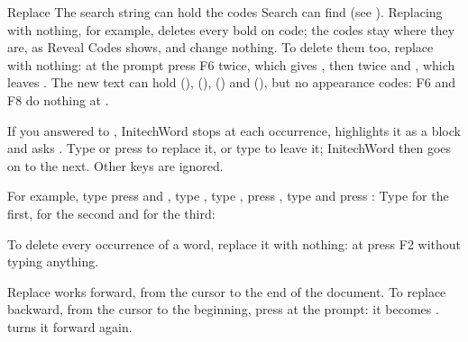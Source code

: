 \begin{Feature}{Replace}
The search string can hold the codes Search can find (see ).
Replacing \Code{[BOLD]} with nothing, for example, deletes every bold on
code; the \Code{[bold]} codes stay where they are, as Reveal Codes shows,
and change nothing.  To delete them too, replace \Code{[bold]} with
nothing: at the  prompt press F6 twice, which gives
\Code{[BOLD][bold]}, then  twice and , which leaves
\Code{[bold]}.  The new text can hold \Code{[Tab]}
(),  (), \Code{[HRt]} () and
\Code{[HPg]} (), but no appearance codes: F6 and F8 do nothing
at .

If you answered  to , InitechWord stops
at each occurrence, highlights it as a block and asks
.  Type  or press  to replace it, or
type  to leave it; InitechWord then goes on to the next.  Other
keys are ignored.

For example, type
press  and , type
, type , press , type
 and press :
Type  for the first,  for the second and
 for the third:
\EndReplay

To delete every occurrence of a word, replace it with nothing: at
 press F2 without typing anything.

Replace works forward, from the cursor to the end of the document.  To
replace backward, from the cursor to the beginning, press  at the
 prompt: it becomes .   turns it forward
again.


\end{Feature}
